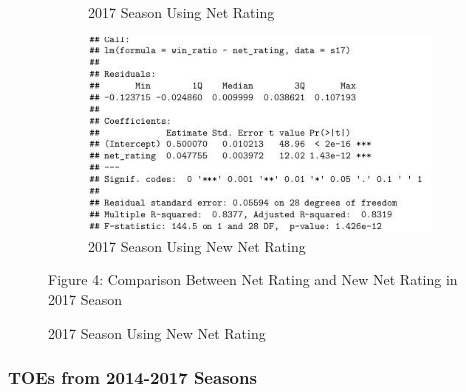 \documentclass[11pt]{article}
\begin{document}
\begin{figure}[h!]
\begin{subfigure}[b]{0.42\linewidth}
    \caption{2017 Season Using Net Rating}
  \end{subfigure}
  \begin{subfigure}[b]{0.42\linewidth}
    \includegraphics[width=\linewidth]{new_nr_17_summary.jpg}
    \caption{2017 Season Using New Net Rating}
  \end{subfigure}

\bigskip

Figure 4: Comparison Between Net Rating and New Net Rating in 2017 Season
\end{figure}

\subsubsection*{TOEs from 2014-2017 Seasons}
\end{document}
